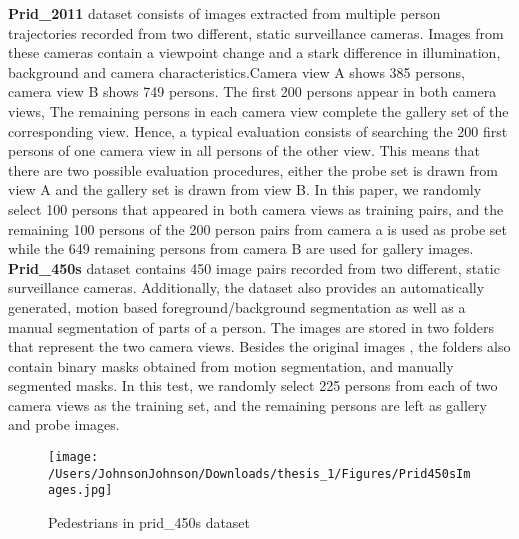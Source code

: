\textbf{Prid\_2011} dataset consists of images extracted from multiple person trajectories recorded from two different, static surveillance cameras. Images from these cameras contain a viewpoint change and a stark difference in illumination, background and camera characteristics.Camera view A shows 385 persons, camera view B shows 749 persons. The first 200 persons appear in both camera views, The remaining persons in each camera view complete the gallery set of the corresponding view. Hence, a typical evaluation consists of searching the 200 first persons of one camera view in all persons of the other view. This means that there are two possible evaluation procedures, either the probe set is drawn from view A and the gallery set is drawn from view B. In this paper, we randomly select 100 persons that appeared in both camera views as training pairs, and the remaining 100 persons of the 200 person pairs from camera a is used as probe set while the 649 remaining persons from camera B are used for gallery images.\\
\textbf{Prid\_450s} dataset contains 450 image pairs recorded from two different, static surveillance cameras. Additionally, the dataset also provides an automatically generated, motion based foreground/background segmentation as well as a manual segmentation of parts of a person. The images are stored in two folders that represent the two camera views. Besides the original images , the folders also contain binary masks obtained from motion segmentation, and manually segmented masks. In this test, we randomly select 225 persons from each of two camera views as the training set, and the remaining persons are left as gallery and probe images. 
\begin{figure}[H]
\begin{raggedleft}
\texttt{[image: /Users/JohnsonJohnson/Downloads/thesis\_1/Figures/Prid450sImages.jpg]}
\vspace{-3em}
\caption{Pedestrians in prid\_450s dataset}
\end{raggedleft}
\end{figure}


